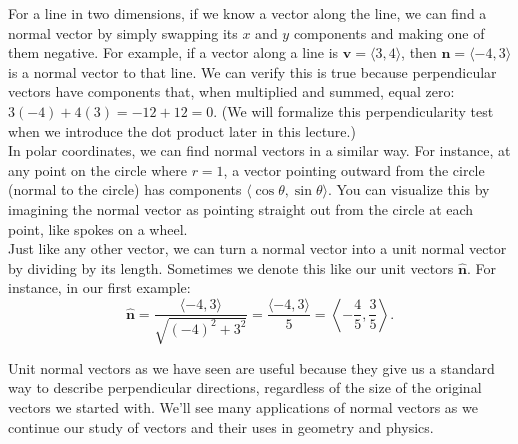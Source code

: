 \noindent For a line in two dimensions, if we know a vector along the line, we can find a normal vector by simply swapping its $x$ and $y$ components and making one of them negative. For example, if a vector along a line is \( \mathbf{v} = \langle 3, 4 \rangle \), then \( \mathbf{n} = \langle -4, 3 \rangle \) is a normal vector to that line. We can verify this is true because perpendicular vectors have components that, when multiplied and summed, equal zero: \( 3(-4) + 4(3) = -12 + 12 = 0 \). (We will formalize this perpendicularity test when we introduce the dot product later in this lecture.) \\

\noindent  In polar coordinates, we can find normal vectors in a similar way. For instance, at any point on the circle where \( r = 1 \), a vector pointing outward from the circle (normal to the circle) has components \( \langle \cos\theta, \sin\theta \rangle \). You can visualize this by imagining the normal vector as pointing straight out from the circle at each point, like spokes on a wheel. \\




\noindent Just like any other vector, we can turn a normal vector into a unit normal vector by dividing by its length. Sometimes we denote this like our unit vectors $\mathbf{\hat{n}}$. For instance, in our first example:
\[
\mathbf{\hat{n}} = \frac{\langle -4, 3 \rangle}{\sqrt{(-4)^2 + 3^2}} = \frac{\langle -4, 3 \rangle}{5} = \left\langle -\frac{4}{5}, \frac{3}{5} \right\rangle.
\]

\noindent Unit normal vectors as we have seen are useful because they give us a standard way to describe perpendicular directions, regardless of the size of the original vectors we started with. We'll see many applications of normal vectors as we continue our study of vectors and their uses in geometry and physics.

